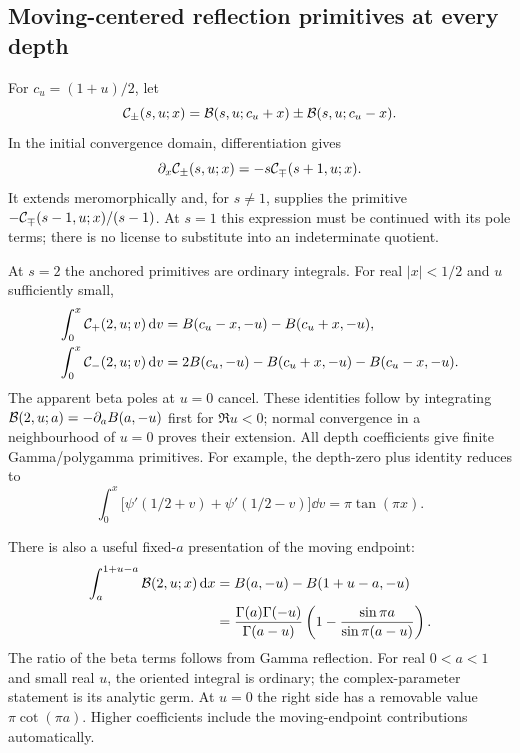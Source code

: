 \subsection{Moving-centered reflection primitives at every depth}

For $c_u=(1+u)/2$, let
\[
 \mathcal C_\pm(s,u;x)=\mathcal B(s,u;c_u+x)\pm\mathcal B(s,u;c_u-x).
\]
In the initial convergence domain, differentiation gives
\begin{equation}\label{agrc:parity-derivatives}
 \partial_x\mathcal C_\pm(s,u;x)=-s\mathcal C_\mp(s+1,u;x).
\end{equation}
It extends meromorphically and, for $s\ne1$, supplies the primitive
$-\mathcal C_\mp(s-1,u;x)/(s-1)$. At $s=1$ this expression must be continued
with its pole terms; there is no license to substitute into an
indeterminate quotient.

At $s=2$ the anchored primitives are ordinary integrals. For real
$|x|<1/2$ and $u$ sufficiently small,
\begin{align}
 \int_0^x\mathcal C_+(2,u;v)\,\mathrm d v
   &=B(c_u-x,-u)-B(c_u+x,-u),\label{agrc:primitive-plus}\\
 \int_0^x\mathcal C_-(2,u;v)\,\mathrm d v
   &=2B(c_u,-u)-B(c_u+x,-u)-B(c_u-x,-u).
 \label{agrc:primitive-minus}
\end{align}
The apparent beta poles at $u=0$ cancel. These identities follow by
integrating $\mathcal B(2,u;a)=-\partial_a B(a,-u)$ first for $\Re u<0$;
normal convergence in a neighbourhood of $u=0$ proves their extension.
All depth coefficients give finite Gamma/polygamma primitives.
For example, the depth-zero plus identity reduces to
\begin{equation}\label{agrc:trigamma-primitive}
 \int_0^x\bigl[\psi'(1/2+v)+\psi'(1/2-v)\bigr]\dd v
       =\pi\tan(\pi x).
\end{equation}

There is also a useful fixed-$a$ presentation of the moving endpoint:
\begin{align}
 \int_a^{1+u-a}\mathcal B(2,u;x)\,\mathrm d x
 &=B(a,-u)-B(1+u-a,-u)\notag\\
 &=\frac{\Gamma(a)\Gamma(-u)}{\Gamma(a-u)}
       \left(1-\frac{\sin\pi a}{\sin\pi(a-u)}\right).
 \label{agrc:moving-endpoint}
\end{align}
The ratio of the beta terms follows from Gamma reflection. For real
$0<a<1$ and small real $u$, the oriented integral is ordinary; the
complex-parameter statement is its analytic germ. At $u=0$ the right
side has a removable value $\pi\cot(\pi a)$. Higher coefficients include
the moving-endpoint contributions automatically.

